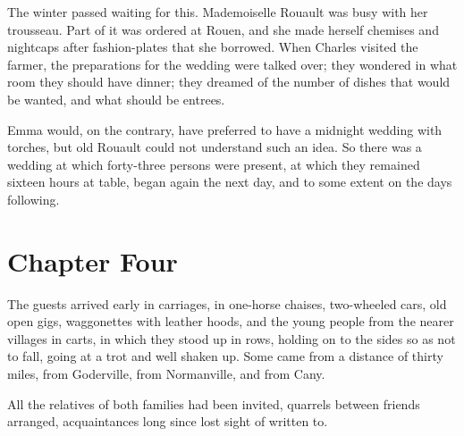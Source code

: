 \documentclass{tufte-book}
\begin{document}
The winter passed waiting for this. Mademoiselle Rouault was busy with
her trousseau. Part of it was ordered at Rouen, and she made herself
chemises and nightcaps after fashion-plates that she borrowed. When
Charles visited the farmer, the preparations for the wedding were talked
over; they wondered in what room they should have dinner; they dreamed
of the number of dishes that would be wanted, and what should be
entrees.

Emma would, on the contrary, have preferred to have a midnight wedding
with torches, but old Rouault could not understand such an idea. So
there was a wedding at which forty-three persons were present, at which
they remained sixteen hours at table, began again the next day, and to
some extent on the days following.



\chapter{Chapter Four}

The guests arrived early in carriages, in one-horse chaises, two-wheeled
cars, old open gigs, waggonettes with leather hoods, and the young
people from the nearer villages in carts, in which they stood up in
rows, holding on to the sides so as not to fall, going at a trot
and well shaken up. Some came from a distance of thirty miles, from
Goderville, from Normanville, and from Cany.

All the relatives of both families had been invited, quarrels between
friends arranged, acquaintances long since lost sight of written to.
\end{document}
